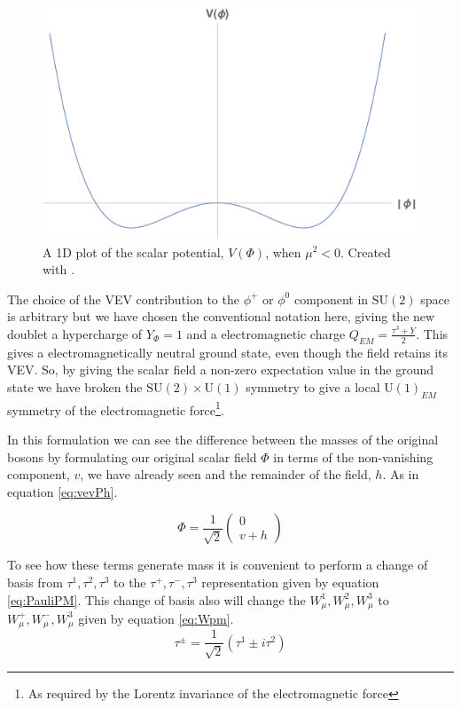 \begin{figure}
\begin{center}
\includegraphics[width=0.75\linewidth]{Introduction/Mexican_Hat_1D.pdf}
\caption{A 1D plot of the scalar potential, $V\left(\Phi\right)$, when $\mu^2 < 0$. Created with \cite{Mathematica10_1}.}
\label{fig:1Dbroken}
\end{center}
\end{figure}

The choice of the VEV contribution to the $\phi^{+}$ or $\phi^{0}$ component in $\mathrm{SU}(2)$ space is arbitrary but we have chosen the conventional notation here, giving the new doublet a hypercharge of $Y_{\Phi} = 1$ and a electromagnetic charge $Q_{EM} = \frac{\tau^{3} + Y}{2}$. This gives a electromagnetically neutral ground state, even though the field retains its VEV. So, by giving the scalar field a non-zero expectation value in the ground state we have broken the $\mathrm{SU}(2) \times \mathrm{U}(1)$ symmetry to give a local $\mathrm{U}(1)_{EM}$ symmetry of the electromagnetic force\footnote{As required by the Lorentz invariance of the electromagnetic force}.

In this formulation we can see the difference between the masses of the original bosons by formulating our original scalar field $\Phi$ in terms of the non-vanishing component, $v$, we have already seen and the remainder of the field, $h$. As in equation \ref{eq:vevPh}.

\begin{equation}
\label{eq:vevPh}
\Phi =  \frac{1}{\sqrt{2}} \begin{pmatrix} 0 \\ v + h \end{pmatrix}
\end{equation}

To see how these terms generate mass it is convenient to perform a change of basis from $\tau^{1}, \tau^{2}, \tau^{3}$ to the $\tau^{+}, \tau^{-}, \tau^{3}$ representation given by equation \ref{eq:PauliPM}. This change of basis also will change the $W^{1}_{\mu}, W^{2}_{\mu}, W^{3}_{\mu}$ to  $W^{+}_{\mu}, W^{-}_{\mu}, W^{3}_{\mu}$ given by equation \ref{eq:Wpm}.
\begin{equation}
\label{eq:PauliPM}
\tau^{\pm}  =  \frac{1}{\sqrt{2}}\left(\tau^{1} \pm i \tau^{2}\right)
\end{equation}

